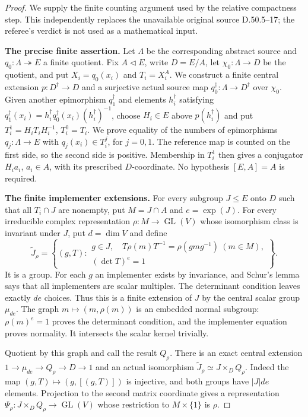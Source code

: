 \begin{proof}
We supply the finite counting argument used by the
relative compactness step. This independently replaces
the unavailable original source D.50.5--17; the referee's
verdict is not used as a mathematical input.

\medskip\noindent\textbf{The precise finite assertion.}
Let $\Lambda$ be the corresponding abstract source and
$q_0:\Lambda\twoheadrightarrow E$ a finite quotient.
Fix $A\triangleleft E$, write $D=E/A$, let
$\chi_0:\Lambda\to D$ be the quotient, and put
$X_i=q_0(x_i)$ and $T_i=X_i^A$.
We construct a finite central extension
$p:D^\dagger\to D$ and a surjective actual source map
$q_0^\dagger:\Lambda\to D^\dagger$ over $\chi_0$.
Given another epimorphism $q_1^\dagger$ and elements
$h_i^\dagger$ satisfying
$q_1^\dagger(x_i)=h_i^\dagger q_0^\dagger(x_i)
(h_i^\dagger)^{-1}$, choose $H_i\in E$ above
$p(h_i^\dagger)$ and put $T_i^1=H_iT_iH_i^{-1}$,
$T_i^0=T_i$.
We prove equality of the numbers of epimorphisms
$q_j:\Lambda\to E$ with $q_j(x_i)\in T_i^j$,
for $j=0,1$. The reference map is counted on the
first side, so the second side is positive.
Membership in $T_i^1$ then gives a conjugator
$H_i a_i$, $a_i\in A$, with its prescribed
$D$-coordinate. No hypothesis $[E,A]=A$ is required.

\medskip\noindent\textbf{The finite implementer extensions.}
For every subgroup $J\leq E$ onto $D$ such that all
$T_i\cap J$ are nonempty, put $M=J\cap A$ and
$e=\exp(J)$. For every irreducible complex representation
$\rho:M\to\operatorname{GL}(V)$ whose isomorphism class
is invariant under $J$, put $d=\dim V$ and define
\[
 \widetilde J_\rho=
 \left\{(g,T):\begin{array}{l}
  g\in J,\quad T\rho(m)T^{-1}=\rho(gmg^{-1})\ (m\in M),\\
  (\det T)^e=1
 \end{array}\right\}.
                                                               \tag{E.233}
\]
It is a group. For each $g$ an implementer exists by
invariance, and Schur's lemma says that all implementers
are scalar multiples. The determinant condition leaves
exactly $de$ choices. Thus this is a finite extension
of $J$ by the central scalar group $\mu_{de}$.
The graph $m\mapsto(m,\rho(m))$ is an embedded normal
subgroup: $\rho(m)^e=1$ proves the determinant condition,
and the implementer equation proves normality.
It intersects the scalar kernel trivially.

Quotient by this graph and call the result $Q_\rho$.
There is an exact central extension
$1\to\mu_{de}\to Q_\rho\to D\to1$ and an actual
isomorphism
$\widetilde J_\rho\simeq J\times_DQ_\rho$.
Indeed the map $(g,T)\mapsto(g,[(g,T)])$ is injective,
and both groups have $|J|de$ elements. Projection to
the second matrix coordinate gives a representation
$\Psi_\rho:J\times_DQ_\rho\to\operatorname{GL}(V)$
whose restriction to $M\times\{1\}$ is $\rho$.


\end{proof}
